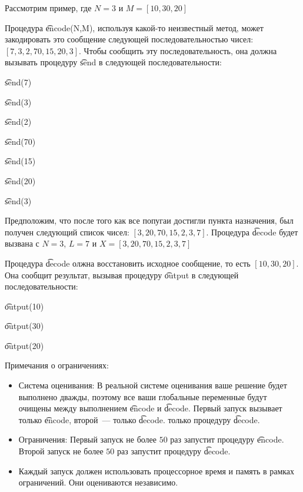 Рассмотрим пример, где $N = 3$ и
$M=[10,30,20]$

Процедура \t{encode(N,M)}, используя какой-то неизвестный метод, может закодировать это
сообщение следующей последовательностью чисел: $[7, 3, 2, 70, 15, 20, 3]$. Чтобы сообщить
эту последовательность, она должна вызывать процедуру \t{send} в следующей последовательности:

\t{send(7)}

\t{send(3)}

\t{send(2)}

\t{send(70)}

\t{send(15)}

\t{send(20)}

\t{send(3)}

Предположим, что после того как все попугаи достигли пункта назначения, был получен
следующий список чисел: $[3, 20, 70, 15, 2, 3, 7]$. Процедура \t{decode} будет вызвана с $N=3$, $L=7$ и $X=[3, 20, 70, 15, 2, 3, 7]$

Процедура \t{decode} олжна восстановить исходное сообщение, то есть $[10, 30, 20]$. Она
сообщит результат, вызывая процедуру \t{output} в следующей последовательности:

\t{output(10)}

\t{output(30)}

\t{output(20)}

Примечания о ограничениях:
\begin{itemize}
\item Система оценивания: В реальной системе оценивания ваше решение будет
выполнено дважды, поэтому все ваши глобальные переменные будут очищены между выполнением \t{encode} и \t{decode}. Первый запуск вызывает только \t{encode}, второй~--- только \t{decode}.
только процедуру \t{decode}.
\item Ограничения: Первый запуск не более $50$ раз запустит процедуру \t{encode}. Второй запуск не более $50$ раз запустит процедуру \t{decode}. 
\item Каждый запуск должен использовать процессорное время и память в рамках ограничений. Они оцениваются независимо.
\end{itemize}